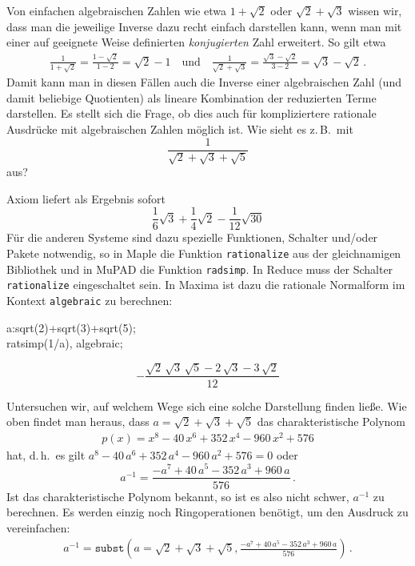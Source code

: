 \documentclass[11pt,a4paper]{article}
\newcommand{\cas}[1]{{\sc #1}}
\begin{document}
Von einfachen algebraischen Zahlen wie etwa $1+\sqrt{2}$ oder
$\sqrt{2}+\sqrt{3}$ wissen wir, dass man die jeweilige Inverse dazu recht
einfach darstellen kann, wenn man mit einer auf geeignete Weise definierten
\emph{konjugierten} Zahl erweitert. So gilt etwa
\begin{gather*}
  \frac{1}{1+\sqrt{2}} = \frac{1-\sqrt{2}}{1-2} = \sqrt{2} -1
  \quad\text{und}\quad \frac{1}{\sqrt{2}+\sqrt{3}} =
  \frac{\sqrt{3}-\sqrt{2}}{3-2} =\sqrt{3}-\sqrt{2}\,.
\end{gather*}
Damit kann man in diesen Fällen auch die Inverse einer algebraischen Zahl (und
damit beliebige Quotienten) als lineare Kombination der reduzierten Terme
darstellen.  Es stellt sich die Frage, ob dies auch für kompliziertere
rationale Ausdrücke mit algebraischen Zahlen möglich ist.  Wie sieht es
z.\,B.\ mit
\[\frac{1}{\sqrt{2}+\sqrt{3}+\sqrt{5}}\]
aus?

\cas{Axiom} liefert als Ergebnis sofort
\[\frac{1}{6}\sqrt{3}+\frac{1}{4}\sqrt{2}-\frac{1}{12}\sqrt{30}\]
Für die anderen Systeme sind dazu spezielle Funktionen, Schalter und/oder
Pakete notwendig, so in \cas{Maple} die Funktion \texttt{rationalize} aus der
gleichnamigen Bibliothek und in \cas{MuPAD} die Funktion \texttt{radsimp}. In
\cas{Reduce} muss der Schalter \texttt{rationalize} eingeschaltet sein. In
\cas{Maxima} ist dazu die rationale Normalform im Kontext \texttt{algebraic} zu
berechnen:
\begin{code}
a:sqrt(2)+sqrt(3)+sqrt(5);\\
ratsimp(1/a), algebraic;
\end{code}
\[-{\frac{\sqrt{2}\,\sqrt{3}\,\sqrt{5}-2\,\sqrt{3}-3\,\sqrt{2}}{12}}\]
\medskip

Untersuchen wir, auf welchem Wege sich eine solche Darstellung finden ließe.
Wie oben findet man heraus, dass $a=\sqrt{2}+\sqrt{3}+\sqrt{5}$ das
charakteristische Polynom 
\begin{gather*}
  p(x)=x^8-40\,x^6+352\,x^4-960\,x^2+576
\end{gather*}
hat, d.\,h.\ es gilt $a^8-40\,a^6+352\,a^4-960\,a^2+576=0$ oder
\[a^{-1}=\frac{-a^7+40\,a^5-352\,a^3+960\,a}{576}\,.\]
Ist das charakteristische Polynom bekannt, so ist es also nicht schwer,
$a^{-1}$ zu berechnen. Es werden einzig noch Ringoperationen benötigt, um den
Ausdruck zu vereinfachen:
\begin{gather*}
  a^{-1}=\texttt{subst}\left(a=\sqrt{2}+\sqrt{3}+\sqrt{5},
  \frac{-a^7+40\,a^5-352\,a^3+960\,a}{576}\right)\,.
\end{gather*}
\end{document}
